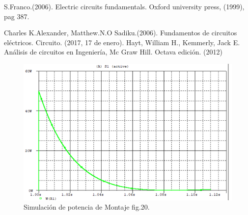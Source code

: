 \documentclass[twocolumn,11pts]{IEEEtran}
\renewcommand{\refname}{Referencias}
\begin{document}
\renewcommand{\refname}{Referencias}

\begin{thebibliography}{5}
 S.Franco.(2006). Electric circuits fundamentals.
Oxford university press, (1999), pag 387.

 Charles K.Alexander, Matthew.N.O Sadiku.(2006). Fundamentos de circuitos eléctricos.
Circuito. (2017, 17 de enero).
 Hayt, William H., Kemmerly, Jack E. Análisis de circuitos en Ingeniería, Mc Graw Hill. Octava edición. (2012)
\end{thebibliography}




\begin{center}
 \begin{figure}[H]
 \centering
 \includegraphics[scale=0.6]{Potencia1.png}
\caption{Simulación de potencia de Montaje fig.20.}
 \end{figure}
\end{center}


\end{document}
